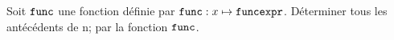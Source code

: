 \documentclass[exercice]{thedocument}%
\begin{document}
%
Soit $\<func;$ une fonction définie par $\<func;:x\mapsto\<funcexpr;$.
Déterminer tous les antécédents de \<n; par la fonction $\<func;$.\vskip100pt
\end{document}
